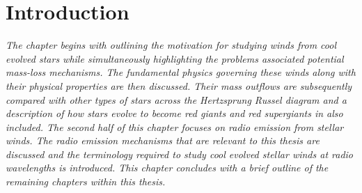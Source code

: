 \chapter{Introduction} \label{chap:1}
\vspace{-1cm}
\textit{The chapter begins with outlining the motivation for studying winds from cool evolved stars while simultaneously highlighting the problems associated potential mass-loss mechanisms. The fundamental physics governing these winds along with their physical properties are then discussed. Their mass outflows are subsequently compared with other types of stars across the Hertzsprung Russel diagram and a description of how stars evolve to become red giants and red supergiants in also included. The second half of this chapter focuses on radio emission from stellar winds. The radio emission mechanisms that are relevant to this thesis are discussed and the terminology required to study cool evolved stellar winds at radio wavelengths is introduced. This chapter concludes with a brief outline of the remaining chapters within this thesis.}

\pagebreak

